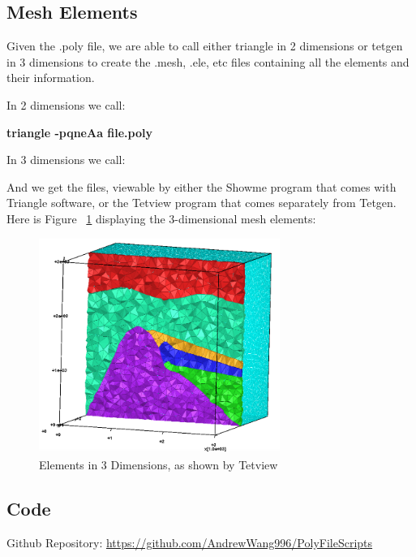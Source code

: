 \subsection{Mesh Elements}

Given the .poly file, we are able to call either triangle in 2 dimensions or tetgen in 3 dimensions to create the .mesh, .ele, etc files containing all the elements and their information. 

In 2 dimensions we call:
\begin{center}
\textbf{triangle -pqneAa file.poly}
\end{center}


In 3 dimensions we call:
\begin{center}
\end{center}

And we get the files, viewable by either the Showme program that comes with Triangle software, or the Tetview program that comes separately from Tetgen. Here is Figure ~\ref{fig:Elements} displaying the 3-dimensional mesh elements:

\begin{figure}[ht]
	\centering
	\includegraphics[width=0.7\textwidth]{Images/Elements.png}
	\caption{Elements in 3 Dimensions, as shown by Tetview}
	\label{fig:Elements}
\end{figure}





\subsection{Code}

Github Repository: \href{https://github.com/AndrewWang996/PolyFileScripts}{https://github.com/AndrewWang996/PolyFileScripts}





